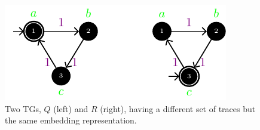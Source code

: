 \begin{figure}[!t]
	\centering
	\includegraphics[scale=1.1]{images/counterexample.pdf}
	\caption{Two TGs, $Q$ (left) and $R$ (right), having a different set of traces but the same embedding representation.}\label{fig:counterexample}
\end{figure}
%
%
%
